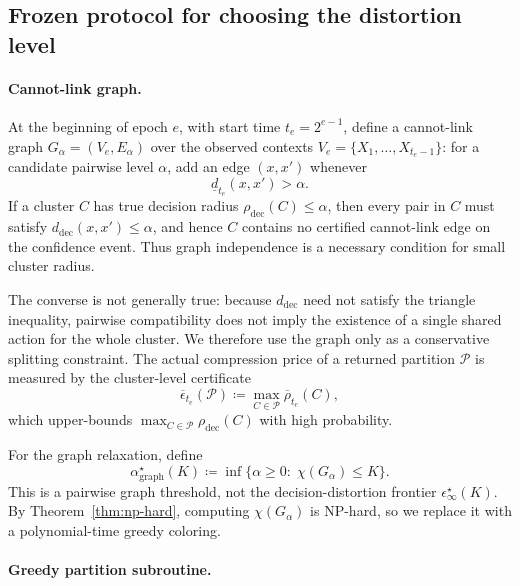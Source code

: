 \documentclass{article}
\theoremstyle{plain}
\theoremstyle{definition}
\theoremstyle{remark}
\newcommand{\eps}{\epsilon}
\begin{document}
\subsection{Frozen protocol for choosing the distortion level}
\label{app:frozen-protocol}

\paragraph{Cannot-link graph.}
At the beginning of epoch \(e\), with start time \(t_e=2^{e-1}\), define a
cannot-link graph \(G_\alpha=(V_e,E_\alpha)\) over the observed contexts
\(V_e=\{X_1,\dots,X_{t_e-1}\}\): for a candidate pairwise level \(\alpha\),
add an edge \((x,x')\) whenever
\[
\underline d_{t_e}(x,x')>\alpha .
\]
If a cluster \(C\) has true decision radius
\(\rho_{\mathrm{dec}}(C)\le \alpha\), then every pair in \(C\) must satisfy
\(d_{\mathrm{dec}}(x,x')\le \alpha\), and hence \(C\) contains no certified
cannot-link edge on the confidence event. Thus graph independence is a
necessary condition for small cluster radius.

The converse is not generally true: because \(d_{\mathrm{dec}}\) need not
satisfy the triangle inequality, pairwise compatibility does not imply the
existence of a single shared action for the whole cluster. We therefore use
the graph only as a conservative splitting constraint. The actual
compression price of a returned partition \(\mathcal P\) is measured by the
cluster-level certificate
\begin{equation}
\label{eq:certified-cluster-distortion}
\overline\eps_{t_e}(\mathcal P)
\coloneqq
\max_{C\in\mathcal P}\overline\rho_{t_e}(C),
\end{equation}
which upper-bounds
\(\max_{C\in\mathcal P}\rho_{\mathrm{dec}}(C)\) with high probability.

For the graph relaxation, define
\begin{equation}
\label{eq:graph-relax-threshold}
\alpha^\star_{\mathrm{graph}}(K)
\coloneqq
\inf\bigl\{
\alpha\ge 0:\;\chi(G_\alpha)\le K
\bigr\}.
\end{equation}
This is a pairwise graph threshold, not the decision-distortion frontier
\(\eps^\star_\infty(K)\).
By Theorem~\ref{thm:np-hard}, computing \(\chi(G_\alpha)\) is NP-hard, so we
replace it with a polynomial-time greedy coloring.

\paragraph{Greedy partition subroutine.}
\end{document}
